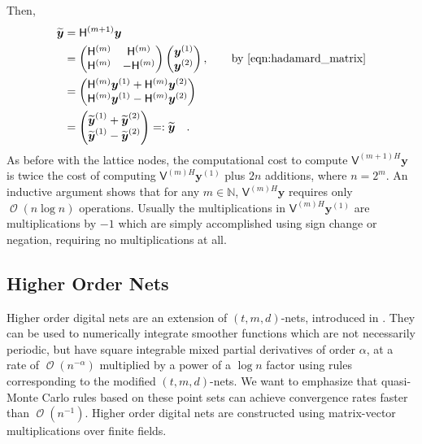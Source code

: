 \documentclass{svjour3}                     %
\DeclareMathOperator{\Order}{{\mathcal O}}
\newcommand{\bm}[1]{\boldsymbol{#1}}
\newcommand{\naturals}{\mathbb{N}}
\newcommand{\vy}{\bm{y}}
\newcommand{\mH}{\mathsf{H}}
\newcommand{\mV}{\mathsf{V}}
\begin{document}
Then,
\begin{align*}
\widetilde{\vy} &= \mH^{({m+1})} {\vy} \\
& = \begin{pmatrix}
\mH^{(m)} & \mH^{(m)} \\ \mH^{(m)} & - \mH^{(m)}
\end{pmatrix} 
\begin{pmatrix}
\vy^{(1)} \\ \vy^{(2)}
\end{pmatrix}, \qquad \text{by \eqref{eqn:hadamard_matrix}} \\
&= 
\begin{pmatrix}
\mH^{(m)} \vy^{(1)} + \mH^{(m)} \vy^{(2)} \\ 
\mH^{(m)} \vy^{(1)} - \mH^{(m)} \vy^{(2)}
\end{pmatrix}\\
&= 
\begin{pmatrix}
\widetilde{\vy}^{(1)} + \widetilde {\vy}^{(2)} \\ 
\widetilde {\vy}^{(1)} - \widetilde {\vy}^{(2)}
\end{pmatrix} =: \widetilde{\vy} \quad.
\end{align*}
As before with the lattice nodes, the computational cost to compute $\mV^{(m+1)H} \vy$ is 
twice the cost of computing $\mV^{(m)H} \vy^{(1)}$ plus $2n$ additions, where $n=2^m$. An inductive argument shows that for any $m \in \naturals$, $\mV^{(m)H}\vy$ requires only $\Order(n \log n)$ operations. Usually the multiplications in $\mV^{(m)H} \vy^{(1)}$ are multiplications by $-1$ which are simply accomplished using sign change or negation, requiring no multiplications at all.


\subsection{Higher Order Nets}

Higher order digital nets are an extension of $(t,m,d)$-nets, introduced in \cite{Dic08a}. They can be used to numerically integrate smoother functions which are not necessarily periodic, but have square integrable mixed partial derivatives of order $\alpha$, at a rate of $\Order(n^{-\alpha})$ multiplied by a power of a $\log n$ factor using rules corresponding to the modified $(t,m, d)$-nets.
We want to emphasize that quasi-Monte Carlo rules based on these point sets can achieve convergence rates faster than $\Order(n^{-1})$. 
Higher order digital nets are constructed using matrix-vector multiplications over finite
fields. 
\end{document}
